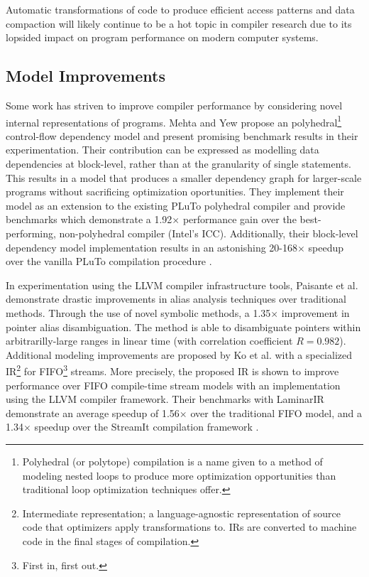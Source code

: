 \documentclass[nobib]{tufte-handout}
\begin{document}
Automatic transformations of code to produce efficient access patterns and data compaction will likely continue to be a hot topic in compiler research due to its lopsided impact on program performance on modern computer systems.


\subsection{Model Improvements}
Some work has striven to improve compiler performance by considering novel internal representations of programs.  Mehta and Yew propose an polyhedral\footnote{Polyhedral (or polytope) compilation is a name given to a method of modeling nested loops to produce more optimization opportunities than traditional loop optimization techniques offer.} control-flow dependency model and present promising benchmark results in their experimentation.  Their contribution can be expressed as modelling data dependencies at block-level, rather than at the granularity of single statements.  This results in a model that produces a smaller dependency graph for larger-scale programs without sacrificing optimization oportunities.  They implement their model as an extension to the existing PLuTo polyhedral compiler and provide benchmarks which demonstrate a 1.92$\times$ performance gain over the best-performing, non-polyhedral compiler (Intel's ICC).  Additionally, their block-level dependency model implementation results in an astonishing 20-168$\times$ speedup over the vanilla PLuTo compilation procedure \cite{Mehta}.

In experimentation using the LLVM compiler infrastructure tools, Paisante et al. demonstrate drastic improvements in alias analysis techniques over traditional methods.  Through the use of novel symbolic methods, a 1.35$\times$ improvement in pointer alias disambiguation.  The method is able to disambiguate pointers within arbitrarilly-large ranges in linear time (with correlation coefficient $R = 0.982$).  Additional modeling improvements are proposed by Ko et al. with a specialized IR\footnote{Intermediate representation; a language-agnostic representation of source code that optimizers apply transformations to.  IRs are converted to machine code in the final stages of compilation.} for FIFO\footnote{First in, first out.} streams.  More precisely, the proposed IR is shown to improve performance over FIFO compile-time stream models with an implementation using the LLVM compiler framework.  Their benchmarks with LaminarIR demonstrate an average speedup of 1.56$\times$ over the traditional FIFO model, and a 1.34$\times$ speedup over the StreamIt compilation framework \cite{Ko}.
\end{document}
